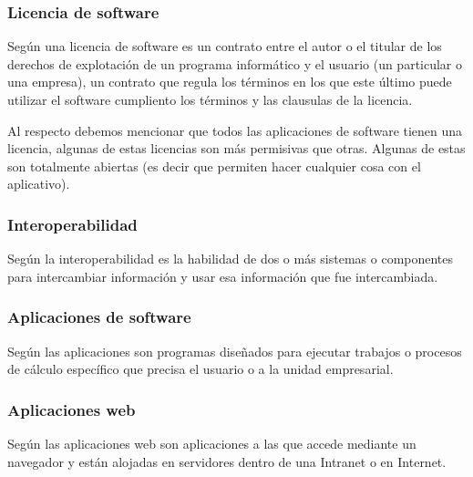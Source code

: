 \subsubsection{Licencia de software}
Seg\'un \cite{moro} una licencia de software es un contrato entre el autor o el titular
de los derechos de explotaci\'on de un programa inform\'atico y el usuario (un particular
o una empresa), un contrato que regula los t\'erminos en los que este \'ultimo puede
utilizar el software cumpliento los t\'erminos y las clausulas de la licencia.

Al respecto debemos mencionar que todos las aplicaciones de software tienen una
licencia, algunas de estas licencias son m\'as permisivas que otras. Algunas de estas
son totalmente abiertas (es decir que permiten hacer cualquier cosa con el aplicativo).
\subsubsection{Interoperabilidad}
Seg\'un \cite{kajan} la interoperabilidad es la habilidad de dos o m\'as sistemas o
componentes para intercambiar informaci\'on y usar esa informaci\'on que fue intercambiada.
\subsubsection{Aplicaciones de software}

Seg\'un \cite{pablos} las aplicaciones son programas dise\~nados para ejecutar
trabajos o procesos de c\'alculo espec\'ifico que precisa el usuario o a la unidad
empresarial.
\subsubsection{Aplicaciones web}
Seg\'un \cite{nino} las aplicaciones web son aplicaciones a las que accede mediante un
navegador y est\'an alojadas en servidores dentro de una Intranet o en Internet.

